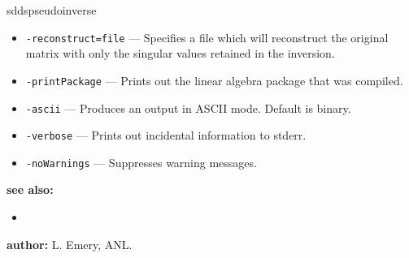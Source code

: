\begin{sddsprog}{sddspseudoinverse}
\begin{itemize}
      \item \verb|-reconstruct=file| --- Specifies a file which will reconstruct the original matrix with only the singular values retained in the inversion.
      \item \verb|-printPackage| --- Prints out the linear algebra package that was compiled.
      \item \verb|-ascii| --- Produces an output in ASCII mode. Default is binary.
      \item \verb|-verbose| --- Prints out incidental information to stderr.
      \item \verb|-noWarnings| --- Suppresses warning messages.
    \end{itemize}
  \item \textbf{see also:}
    \begin{itemize}
      \item {}
    \end{itemize}
  \item \textbf{author:} L. Emery, ANL.
\end{sddsprog}
